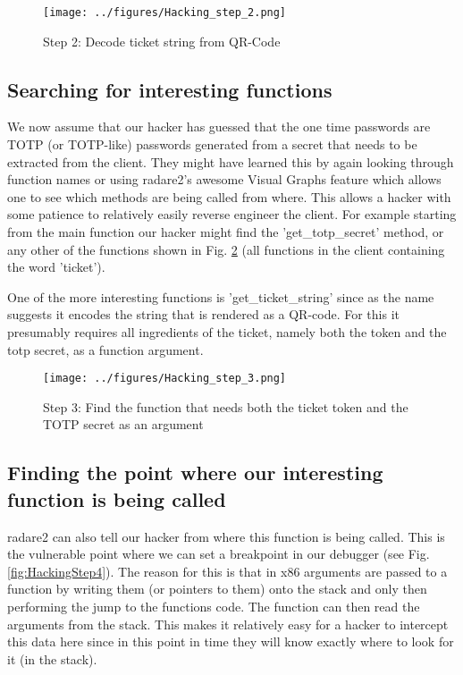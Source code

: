 \begin{figure}[H]
    \centering
    \texttt{[image: ../figures/Hacking\_step\_2.png]}
    \caption{Step 2: Decode ticket string from QR-Code}
    \label{fig:HackingStep2}
\end{figure}

\subsection{Searching for interesting functions}

We now assume that our hacker has guessed that the one time passwords are TOTP (or TOTP-like) passwords generated from a secret that needs to be extracted from the client. They might have learned this by again looking through function names or using radare2's awesome Visual Graphs feature which allows one to see which methods are being called from where. This allows a hacker with some patience to relatively easily reverse engineer the client. For example starting from the main function our hacker might find the 'get\_totp\_secret' method, or any other of the functions shown in Fig. \ref{fig:HackingStep3} (all functions in the client containing the word 'ticket').

One of the more interesting functions is 'get\_ticket\_string' since as the name suggests it encodes the string that is rendered as a QR-code. For this it presumably requires all ingredients of the ticket, namely both the token and the totp secret, as a function argument. 

\begin{figure}[H]
    \centering
    \texttt{[image: ../figures/Hacking\_step\_3.png]}
    \caption{Step 3: Find the function that needs both the ticket token and the TOTP secret as an argument}
    \label{fig:HackingStep3}
\end{figure}

\subsection{Finding the point where our interesting function is being called}
radare2 can also tell our hacker from where this function is being called. This is the vulnerable point where we can set a breakpoint in our debugger (see Fig. \ref{fig:HackingStep4}). The reason for this is that in x86 arguments are passed to a function by writing them (or pointers to them) onto the stack and only then performing the jump to the functions code. The function can then read the arguments from the stack. This makes it relatively easy for a hacker to intercept this data here since in this point in time they will know exactly where to look for it (in the stack).

